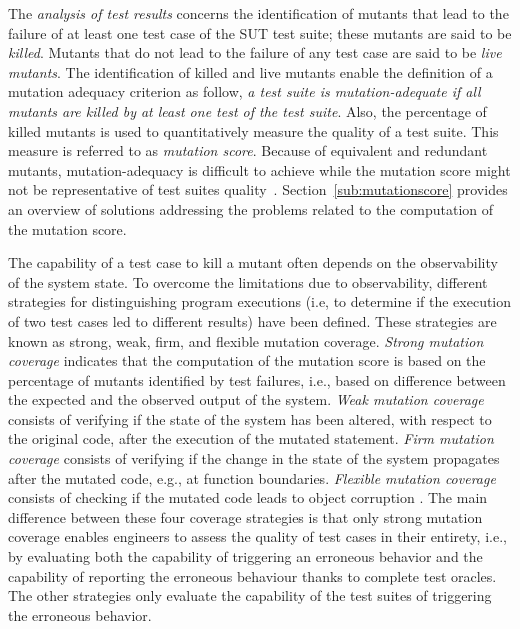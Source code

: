 The \emph{analysis of test results} concerns the identification of mutants that lead to the failure of at least one test case of the SUT test suite; these mutants are said to be \emph{killed}. Mutants that do not lead to the failure of any test case are said to be \emph{live mutants}. The identification of killed and live mutants enable the definition of a mutation adequacy criterion as follow, \emph{a test suite is mutation-adequate if all mutants are killed by at least one test of the test suite}. 
Also, the percentage of killed mutants is used to quantitatively measure the quality of a test suite. This measure is referred to as \emph{mutation score}.
Because of equivalent and redundant mutants, mutation-adequacy is difficult to achieve while the mutation score might not be representative of test suites quality~\cite{papadakis2016threats}. Section~\ref{sub:mutationscore} provides an overview of solutions addressing the problems related to the computation of the mutation score.



The capability of a test case to kill a mutant often depends on the observability of the system state. 
To overcome the limitations due to observability, different strategies for distinguishing program executions (i.e, to determine if the execution of two test cases led to different results) have been defined. These strategies are known as strong, weak, firm, and flexible mutation coverage.
\emph{Strong mutation coverage} indicates that the computation of the mutation score is based on the percentage of mutants identified by test failures, i.e., based on difference between the expected and the observed output of the system.  
\emph{Weak mutation coverage} consists of verifying if the state of the system has been altered, with respect to the original code, after the execution of the mutated statement. 
\emph{Firm mutation coverage} consists of verifying if the change in the state of the system propagates after the mutated code, e.g., at function boundaries. 
\emph{Flexible mutation coverage} consists of checking if the mutated code leads to object corruption \cite{mateo2012validating}. The main difference between these four coverage strategies is that only strong mutation coverage enables engineers to assess the quality of test cases in their entirety, i.e., by evaluating both the capability of triggering an erroneous behavior and the capability of reporting the erroneous behaviour thanks to complete test oracles. The other strategies only evaluate the capability of the test suites of triggering the erroneous behavior. 

